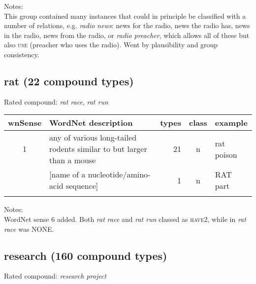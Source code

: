 \noindent
Notes:\\
This group contained many instances that could in principle be
classified with a number of relations, e.g. \emph{radio news}:
news for the radio, news the radio has, news in the radio, news from
the radio, or \emph{radio preacher}, which allows all of these but
also \textsc{use} (preacher who uses the radio). Went by plausibility and
group consistency.


\subsection{rat          (22 compound types)}
Rated compound: \emph{rat race}, \emph{rat run}

\vspace*{1ex}

\noindent
\begin{longtable}{c>{\raggedright\arraybackslash}p{5cm}rc>{\raggedright\arraybackslash}p{2cm}}\lsptoprule
{\small wnSense}&WordNet description&types&class&example\\\midrule
1&any of various long-tailed rodents similar to but larger than a
mouse&21&n&rat poison\\\tablevspace
6&{}[name of a nucleotide/amino-acid sequence]&1&n&RAT part\\\lspbottomrule
\end{longtable}

\pagebreak[4]
\noindent
Notes:\\
WordNet sense 6 added. Both \emph{rat race} and \emph{rat run} classed as \textsc{have2}, while in \citet{BellandSchaefer:2013} \emph{rat race} was NONE.

\subsection{research     (160 compound types)}
Rated compound: \emph{research project}

